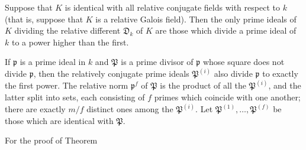 Suppose that $K$ is identical with all relative conjugate fields with respect to $k$ (that is, suppose that $K$ is a relative Galois field). Then the only prime ideals of $K$ dividing the relative different $\mathfrak{D}_k$ of $K$ are those which divide a prime ideal of $k$ to a power higher than the first.

If $\mathfrak{p}$ is a prime ideal in $k$ and $\mathfrak{P}$ is a prime divisor of $\mathfrak{p}$ whose square does not divide $\mathfrak{p}$, then the relatively conjugate prime ideals $\mathfrak{P}^{(i)}$ also divide $\mathfrak{p}$ to exactly the first power. The relative norm $\mathfrak{p}^f$ of $\mathfrak{P}$ is the product of all the $\mathfrak{P}^{(i)}$, and the latter split into sets, each consisting of $f$ primes which coincide with one another; there are exactly $m/f$ distinct ones among the $\mathfrak{P}^{(i)}$. Let $\mathfrak{P}^{(1)}, \ldots, \mathfrak{P}^{(f)}$ be those which are identical with $\mathfrak{P}$.

For the proof of Theorem
